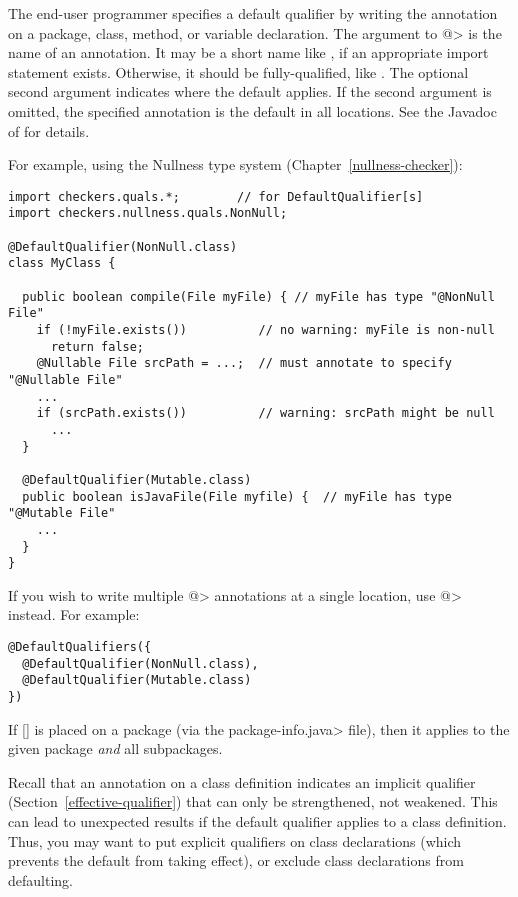 The end-user programmer specifies a default qualifier by writing the 
annotation on a package, class, method, or variable declaration.  The
argument to \<@> is the 
name of an annotation.  It may be a short name like , if an
appropriate import statement exists.  Otherwise, it should be
fully-qualified, like .
The optional second argument indicates where the default
applies.  If the second argument is omitted, the specified annotation is
the default in all locations.  See the Javadoc of  for details.

For example, using the Nullness type system (Chapter~\ref{nullness-checker}):

\begin{Verbatim}
import checkers.quals.*;        // for DefaultQualifier[s]
import checkers.nullness.quals.NonNull;

@DefaultQualifier(NonNull.class)
class MyClass {

  public boolean compile(File myFile) { // myFile has type "@NonNull File"
    if (!myFile.exists())          // no warning: myFile is non-null
      return false;
    @Nullable File srcPath = ...;  // must annotate to specify "@Nullable File"
    ...
    if (srcPath.exists())          // warning: srcPath might be null
      ...
  }

  @DefaultQualifier(Mutable.class)
  public boolean isJavaFile(File myfile) {  // myFile has type "@Mutable File"
    ...
  }
}
\end{Verbatim}

If you wish to write multiple
\<@> annotations at a single location,
use
\<@> instead.  For example:

\begin{Verbatim}
@DefaultQualifiers({
  @DefaultQualifier(NonNull.class),
  @DefaultQualifier(Mutable.class)
})
\end{Verbatim}


If [] is placed on a package (via the
\<package-info.java> file), then it applies to the given package \emph{and}
all subpackages.

Recall that an annotation on a class definition indicates an implicit
qualifier (Section~\ref{effective-qualifier}) that can only be
strengthened, not weakened.  This can lead to unexpected results if
the default qualifier applies to a class definition.  Thus, you may want to
put explicit qualifiers on class declarations (which prevents the default
from taking effect), or exclude class declarations from defaulting.


